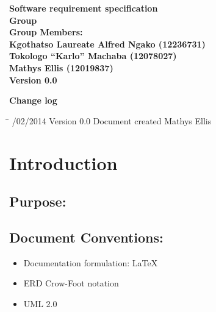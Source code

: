 \documentclass[12pt]{article}
\newcommand{\Title}{Software requirement specification} %
\begin{document}
	\vspace{4em}
	
	\begin{center}%
	
	  \LARGE \bf \Title \\[4em]
	  \LARGE {\bf Group }\\[1em]
	  \LARGE {\bf Group Members:}\\[2em]
	  \large
	     Kgothatso Laureate Alfred Ngako	(12236731) \\[1em]
	     Tokologo “Karlo” Machaba			(12078027) \\[1em]
	     Mathys Ellis						(12019837) \\[8em]
	     {\bf Version 0.0}
	    
	\end{center}%
	
	\newpage
		{\LARGE \bf Change log}\\[2em]
		
		\begin{tabbing}
			\hspace*{2.5cm}\=\hspace*{2.5cm}\=\hspace*{8cm}\=\hspace*{3cm} /02/2014 \> Version 0.0 \> Document created \> Mathys Ellis \\

			
		\end{tabbing}
	
	\newpage
		\tableofcontents	
		
	\newpage
	\section{Introduction}
	
	\vspace{0.2in}

		\subsection{Purpose:}
		\vspace{0.2in}
		 
	
		\vspace{0.2in}
	
		\subsection{Document Conventions:}
		\vspace{0.1in}
		\begin{itemize}
			\item Documentation formulation: LaTeX
			\item ERD Crow-Foot notation
			\item UML 2.0
		\end{itemize}
	
\end{document}
